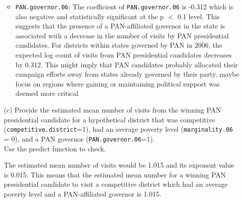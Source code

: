 \documentclass[12pt,letterpaper]{article}
\begin{document}
\begin{enumerate}
\begin{itemize}
		\item \texttt{PAN.governor.06}: The coefficient of \texttt{PAN.governor.06} is -0.312 which is also negative and statistically significant at the p $<$ 0.1 level. This suggests that the presence of a PAN-affiliated governor in the state is associated with a decrease in the number of visits by PAN presidential candidates. For districts within states governed by PAN in 2006, the expected log count of visits from PAN presidential candidates decreases by 0.312. This might imply that PAN candidates probably allocated their campaign efforts away from states already governed by their party, maybe focus on regions where gaining or maintaining political support was deemed more critical
	\end{itemize}
	
	\item [(c)]
	Provide the estimated mean number of visits from the winning PAN presidential candidate for a hypothetical district that was competitive (\texttt{competitive.district}=1), had an average poverty level (\texttt{marginality.06} = 0), and a PAN governor (\texttt{PAN.governor.06}=1).\vspace{.25cm}\\
	\noindent Use the predict function to check.
		
	\noindent The estimated mean number of visits would be 1.015 and its exponent value is 0.015. This means that the estimated mean number for a winning PAN presidential candidate to visit a competitive district which had an average poverty level and a PAN-affiliated governor is 1.015.
	
\end{enumerate}
\end{document}
